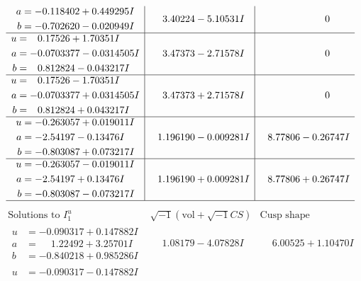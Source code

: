\documentclass[1p]{elsarticle_modified}
\theoremstyle{definition}
\newcommand{\I}{\sqrt{-1}}
\begin{document}
$$\begin{array}{c|c|c}
\begin{aligned}
a &= -0.118402 + 0.449295 I \\
b &= -0.702620 - 0.020949 I\end{aligned}
 & \phantom{-}3.40224 - 5.10531 I & \phantom{-0.000000 } 0 \\ \hline\begin{aligned}
u &= \phantom{-}0.17526 + 1.70351 I \\
a &= -0.0703377 - 0.0314505 I \\
b &= \phantom{-}0.812824 - 0.043217 I\end{aligned}
 & \phantom{-}3.47373 - 2.71578 I & \phantom{-0.000000 } 0 \\ \hline\begin{aligned}
u &= \phantom{-}0.17526 - 1.70351 I \\
a &= -0.0703377 + 0.0314505 I \\
b &= \phantom{-}0.812824 + 0.043217 I\end{aligned}
 & \phantom{-}3.47373 + 2.71578 I & \phantom{-0.000000 } 0 \\ \hline\begin{aligned}
u &= -0.263057 + 0.019011 I \\
a &= -2.54197 - 0.13476 I \\
b &= -0.803087 + 0.073217 I\end{aligned}
 & \phantom{-}1.196190 - 0.009281 I & \phantom{-}8.77806 - 0.26747 I \\ \hline\begin{aligned}
u &= -0.263057 - 0.019011 I \\
a &= -2.54197 + 0.13476 I \\
b &= -0.803087 - 0.073217 I\end{aligned}
 & \phantom{-}1.196190 + 0.009281 I & \phantom{-}8.77806 + 0.26747 I\\
 \hline 
 \end{array}$$\newpage$$\begin{array}{c|c|c}  
\text{Solutions to }I^u_{1}& \I (\text{vol} + \sqrt{-1}CS) & \text{Cusp shape}\\
 \hline 
\begin{aligned}
u &= -0.090317 + 0.147882 I \\
a &= \phantom{-}1.22492 + 3.25701 I \\
b &= -0.840218 + 0.985286 I\end{aligned}
 & \phantom{-}1.08179 - 4.07828 I & \phantom{-}6.00525 + 1.10470 I \\ \hline\begin{aligned}
u &= -0.090317 - 0.147882 I \\

\end{aligned}
\end{array}$$
\end{document}
